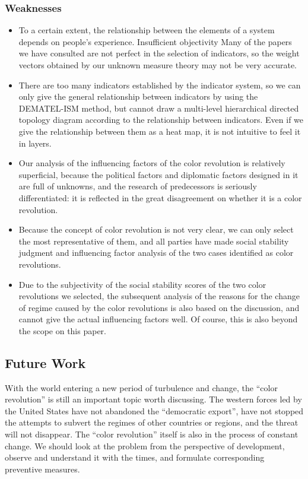 \documentclass[12pt]{article}  %
\begin{document}
\subsubsection{Weaknesses}
\begin{itemize}
    \item To a certain extent, the relationship between the elements of a system depends on people's experience. Insufficient objectivity Many of the papers we have consulted are not perfect in the selection of indicators, so the weight vectors obtained by our unknown measure theory may not be very accurate.
    \item There are too many indicators established by the indicator system, so we can only give the general relationship between indicators by using the DEMATEL-ISM method, but cannot draw a multi-level hierarchical directed topology diagram according to the relationship between indicators. Even if we give the relationship between them as a heat map, it is not intuitive to feel it in layers.
    \item Our analysis of the influencing factors of the color revolution is relatively superficial, because the political factors and diplomatic factors designed in it are full of unknowns, and the research of predecessors is seriously differentiated: it is reflected in the great disagreement on whether it is a color revolution.
    \item Because the concept of color revolution is not very clear, we can only select the most representative of them, and all parties have made social stability judgment and influencing factor analysis of the two cases identified as color revolutions.
    \item Due to the subjectivity of the social stability scores of the two color revolutions we selected, the subsequent analysis of the reasons for the change of regime caused by the color revolutions is also based on the discussion, and cannot give the actual influencing factors well. Of course, this is also beyond the scope on this paper.
 \end{itemize}
\subsection{Future Work}
With the world entering a new period of turbulence and change, the ``color revolution'' is still an important topic worth discussing. The western forces led by the United States have not abandoned the ``democratic export'', have not stopped the attempts to subvert the regimes of other countries or regions, and the threat will not disappear. The ``color revolution'' itself is also in the process of constant change. We should look at the problem from the perspective of development, observe and understand it with the times, and formulate corresponding preventive measures. 
\end{document}
